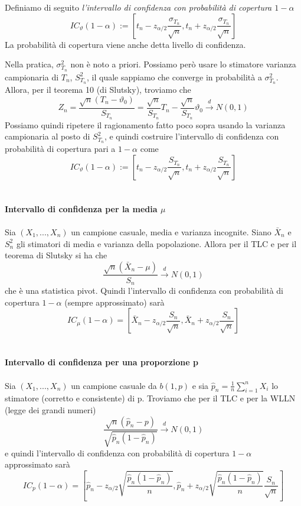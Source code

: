Definiamo di seguito \textit{l'intervallo di confidenza con probabilità di copertura $1-\alpha$} $$IC_\vartheta (1-\alpha) := \left[t_n - z_{\alpha / 2} \frac{\sigma_{T_n}}{\sqrt{n}}, t_n + z_{\alpha / 2} \frac{\sigma_{T_n}}{\sqrt{n}}\right]$$
La probabilità di copertura viene anche detta livello di confidenza.

Nella pratica, $\sigma^2_{T_n}$ non è noto a priori. Possiamo però usare lo stimatore varianza campionaria di $T_n$, $S^2_{T_n}$, il quale sappiamo che converge in probabilità a $\sigma^2_{T_n}$. Allora, per il teorema 10 (di Slutsky), troviamo che 
$$Z_n=\frac{\sqrt{n}(T_n - \vartheta_0)}{S_{T_n}} = \frac{\sqrt{n}}{S_{T_n}} T_n - \frac{\sqrt{n}}{S_{T_n}} \vartheta_0 \stackrel{d}{\rightarrow}N(0,1)$$ Possiamo quindi ripetere il ragionamento fatto poco sopra usando la varianza campionaria al posto di $S^2_{T_n}$, e quindi costruire l'intervallo di confidenza con probabilità di copertura pari a $1 - \alpha$ come $$IC_\vartheta (1-\alpha) := \left[t_n - z_{\alpha / 2} \frac{S_{T_n}}{\sqrt{n}}, t_n + z_{\alpha / 2} \frac{S_{T_n}}{\sqrt{n}}\right]$$
\\ \\
\noindent\textbf{Intervallo di confidenza per la media $\mu$}
\\ \\
Sia $(X_1,...,X_n)$ un campione casuale, media e varianza incognite. Siano $\bar{X}_n$ e $S^2_n$ gli stimatori di media e varianza della popolazione. Allora per il TLC e per il teorema di Slutsky si ha che 
$$\frac{\sqrt{n}(\bar{X}_n - \mu)}{S_n} \stackrel{d}{\rightarrow}N(0,1)$$
che è una statistica pivot. Quindi l'intervallo di confidenza con probabilità di copertura $1-\alpha$ (sempre approssimato) sarà
$$IC_\mu(1-\alpha)=\left[\bar{X}_n - z_{\alpha / 2} \frac{S_n}{\sqrt{n}}, \bar{X}_n + z_{\alpha / 2} \frac{S_n}{\sqrt{n}}\right]$$
\\ \\
\noindent\textbf{Intervallo di confidenza per una proporzione p}
\\ \\
Sia $(X_1,...,X_n)$ un campione casuale da $b(1,p)$ e sia $\hat{p}_n=\frac{1}{n} \sum_{i=1}^n X_i$ lo stimatore (corretto e consistente) di p. Troviamo che per il TLC e per la WLLN (legge dei grandi numeri) $$\frac{\sqrt{n}(\hat{p}_n - p)}{\sqrt{\hat{p}_n(1-\hat{p}_n)}} \stackrel{d}{\rightarrow}N(0,1)$$
e quindi l'intervallo di confidenza con probabilità di copertura $1-\alpha$ approssimato sarà
$$IC_p(1-\alpha)=
\left[\hat{p}_n -
 z_{\alpha / 2} 
 \sqrt{\frac{\hat{p}_n(1-\hat{p}_n)}{n}},
  \hat{p}_n + z_{\alpha / 2}\sqrt{\frac{\hat{p}_n(1-\hat{p}_n)}{n}} \frac{S_n}{\sqrt{n}}\right]$$